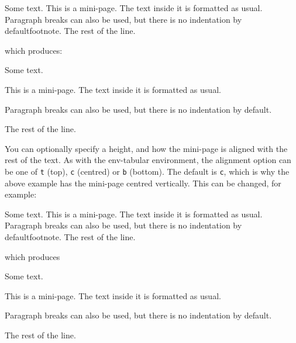 \begin{code}
Some text.\newline
{}\marg{2in}\newline
This is a mini-page. The text inside
it is formatted as usual.\newline
\mbox{}\newline
Paragraph breaks can also be used, but 
there is no indentation by default\gls{footnote}.\newline
{}\newline
The rest of the line.
\end{code}%
which produces:\reportpagebreak
\begin{result}
Some text.
\begin{minipage}{2in}
This is a mini-page. The text inside
it is formatted as usual.

Paragraph breaks can also be used, but 
there is no indentation by default.
\end{minipage}
The rest of the line.
\end{result}

You can optionally specify a height, and how
the mini-page is aligned with the rest of the text. As with
the \gls{env-tabular} environment, the alignment
option  can be one of \texttt{t} (top), \texttt{c} (centred)
or \texttt{b} (bottom). The default is \texttt{c}, which is why
the above example has the mini-page centred vertically. This
can be changed, for example:
\begin{code}
Some text.\newline
{}\marg{2in}\newline
This is a mini-page. The text inside
it is formatted as usual.\newline
\mbox{}\newline
Paragraph breaks can also be used, but 
there is no indentation by default\gls{footnote}.\newline
{}\newline
The rest of the line.
\end{code}
which produces
\begin{result}
\begin{makeimage}
Some text.
\begin{minipage}[t]{2in}
This is a mini-page. The text inside
it is formatted as usual.

Paragraph breaks can also be used, but 
there is no indentation by default.
\end{minipage}
The rest of the line.
\end{makeimage}
\end{result}

